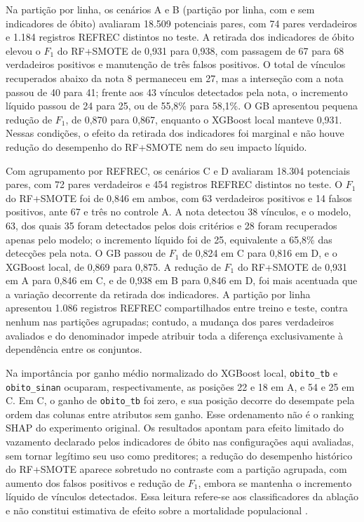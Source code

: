 Na partição por linha, os cenários A e B (partição por linha, com e sem indicadores de óbito) avaliaram 18.509 potenciais pares, com 74 pares verdadeiros e 1.184 registros REFREC distintos no teste. A retirada dos indicadores de óbito elevou o $F_1$ do RF+SMOTE de 0,931 para 0,938, com passagem de 67 para 68 verdadeiros positivos e manutenção de três falsos positivos. O total de vínculos recuperados abaixo da nota 8 permaneceu em 27, mas a interseção com a nota passou de 40 para 41; frente aos 43 vínculos detectados pela nota, o incremento líquido passou de 24 para 25, ou de 55,8\% para 58,1\%. O GB apresentou pequena redução de $F_1$, de 0,870 para 0,867, enquanto o XGBoost local manteve 0,931. Nessas condições, o efeito da retirada dos indicadores foi marginal e não houve redução do desempenho do RF+SMOTE nem do seu impacto líquido.

Com agrupamento por REFREC, os cenários C e D avaliaram 18.304 potenciais pares, com 72 pares verdadeiros e 454 registros REFREC distintos no teste. O $F_1$ do RF+SMOTE foi de 0,846 em ambos, com 63 verdadeiros positivos e 14 falsos positivos, ante 67 e três no controle A. A nota detectou 38 vínculos, e o modelo, 63, dos quais 35 foram detectados pelos dois critérios e 28 foram recuperados apenas pelo modelo; o incremento líquido foi de 25, equivalente a 65,8\% das detecções pela nota. O GB passou de $F_1$ de 0,824 em C para 0,816 em D, e o XGBoost local, de 0,869 para 0,875. A redução de $F_1$ do RF+SMOTE de 0,931 em A para 0,846 em C, e de 0,938 em B para 0,846 em D, foi mais acentuada que a variação decorrente da retirada dos indicadores. A partição por linha apresentou 1.086 registros REFREC compartilhados entre treino e teste, contra nenhum nas partições agrupadas; contudo, a mudança dos pares verdadeiros avaliados e do denominador impede atribuir toda a diferença exclusivamente à dependência entre os conjuntos.

Na importância por ganho médio normalizado do XGBoost local, \texttt{obito\_tb} e \texttt{obito\_\allowbreak sinan} ocuparam, respectivamente, as posições 22 e 18 em A, e 54 e 25 em C. Em C, o ganho de \texttt{obito\_tb} foi zero, e sua posição decorre do desempate pela ordem das colunas entre atributos sem ganho. Esse ordenamento não é o ranking SHAP do experimento original. Os resultados apontam para efeito limitado do vazamento declarado pelos indicadores de óbito nas configurações aqui avaliadas, sem tornar legítimo seu uso como preditores; a redução do desempenho histórico do RF+SMOTE aparece sobretudo no contraste com a partição agrupada, com aumento dos falsos positivos e redução de $F_1$, embora se mantenha o incremento líquido de vínculos detectados. Essa leitura refere-se aos classificadores da ablação e não constitui estimativa de efeito sobre a mortalidade populacional \cite{Jardim2026phdrepo}.

